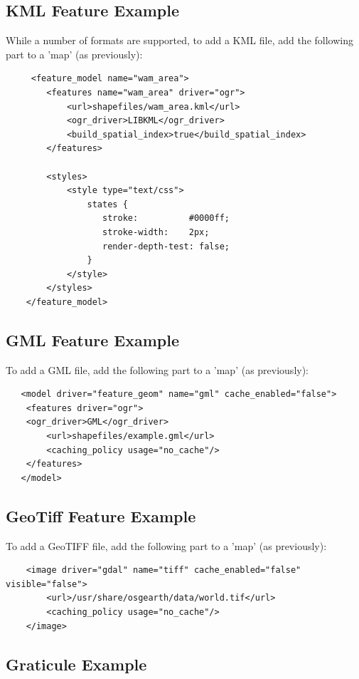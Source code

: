 \subsection{KML Feature Example}

While a number of formats are supported, to add a KML file, add the following part to a 'map' (as previously):

\begin{lstlisting}
     <feature_model name="wam_area">
        <features name="wam_area" driver="ogr">
            <url>shapefiles/wam_area.kml</url>
            <ogr_driver>LIBKML</ogr_driver>
            <build_spatial_index>true</build_spatial_index>
        </features>        

        <styles>
            <style type="text/css">
                states {
                   stroke:          #0000ff; 
                   stroke-width:    2px;
                   render-depth-test: false;
                }                    
            </style>
        </styles>        
    </feature_model>
\end{lstlisting}

\subsection{GML Feature Example}

To add a GML file, add the following part to a 'map' (as previously):

\begin{lstlisting}
   <model driver="feature_geom" name="gml" cache_enabled="false">
    <features driver="ogr">
	<ogr_driver>GML</ogr_driver>
        <url>shapefiles/example.gml</url>
        <caching_policy usage="no_cache"/>
    </features>
   </model>
\end{lstlisting}

\subsection{GeoTiff Feature Example}

To add a GeoTIFF file, add the following part to a 'map' (as previously):

\begin{lstlisting}
    <image driver="gdal" name="tiff" cache_enabled="false" visible="false">
        <url>/usr/share/osgearth/data/world.tif</url>
        <caching_policy usage="no_cache"/>
    </image>
\end{lstlisting}

\subsection{Graticule Example}

